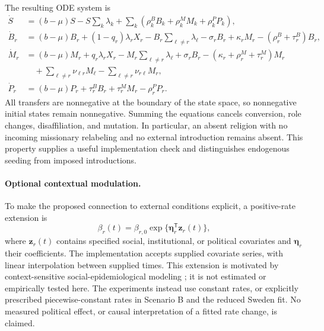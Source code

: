 \documentclass[11pt,a4paper]{article}
\begin{document}
The resulting ODE system is
\begin{align}
\dot S&=(b-\mu)S-S\sum_k\lambda_k+
 \sum_k(\rho_k^BB_k+\rho_k^MM_k+\rho_k^PP_k),\label{eq:S-dynamics}\\
\dot B_r&=(b-\mu)B_r+(1-q_r)\lambda_r X_r-B_r\sum_{\ell\ne r}\lambda_\ell
 -\sigma_rB_r+\kappa_rM_r-(\rho_r^B+\tau_r^B)B_r,\label{eq:B-dynamics}\\
\dot M_r&=(b-\mu)M_r+q_r\lambda_rX_r-M_r\sum_{\ell\ne r}\lambda_\ell
 +\sigma_rB_r-(\kappa_r+\rho_r^M+\tau_r^M)M_r\nonumber\\
&\quad+\sum_{\ell\ne r}\nu_{\ell r}M_\ell-\sum_{\ell\ne r}\nu_{r\ell}M_r,\label{eq:M-dynamics}\\
\dot P_r&=(b-\mu)P_r+\tau_r^BB_r+\tau_r^MM_r-\rho_r^PP_r.\label{eq:P-dynamics}
\end{align}
All transfers are nonnegative at the boundary of the state space, so nonnegative initial states remain nonnegative. Summing the equations cancels conversion, role changes, disaffiliation, and mutation. In particular, an absent religion with no incoming missionary relabeling and no external introduction remains absent. This property supplies a useful implementation check and distinguishes endogenous seeding from imposed introductions.

\paragraph{Optional contextual modulation.}
To make the proposed connection to external conditions explicit, a positive-rate extension is
\begin{equation}
\beta_r(t)=\beta_{r,0}\exp\{\boldsymbol\eta_r^\mathsf{T}\mathbf z_r(t)\},
\label{eq:context}
\end{equation}
where $\mathbf z_r(t)$ contains specified social, institutional, or political covariates and $\boldsymbol\eta_r$ their coefficients. The implementation accepts supplied covariate series, with linear interpolation between supplied times. This extension is motivated by context-sensitive social-epidemiological modeling \cite{emit_paper}; it is not estimated or empirically tested here. The experiments instead use constant rates, or explicitly prescribed piecewise-constant rates in Scenario B and the reduced Sweden fit. No measured political effect, or causal interpretation of a fitted rate change, is claimed.
\end{document}
